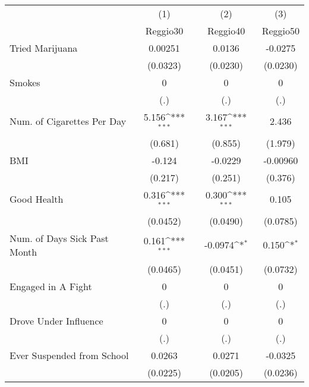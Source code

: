 {
\def\sym#1{\ifmmode^{#1}\else\(^{#1}\)\fi}
\begin{tabular}{l*{3}{c}}
\hline\hline
            &\multicolumn{1}{c}{(1)}&\multicolumn{1}{c}{(2)}&\multicolumn{1}{c}{(3)}\\
            &\multicolumn{1}{c}{Reggio30}&\multicolumn{1}{c}{Reggio40}&\multicolumn{1}{c}{Reggio50}\\
\hline
Tried Marijuana&     0.00251         &      0.0136         &     -0.0275         \\
            &    (0.0323)         &    (0.0230)         &    (0.0230)         \\
[1em]
Smokes      &           0         &           0         &           0         \\
            &         (.)         &         (.)         &         (.)         \\
[1em]
Num. of Cigarettes Per Day&       5.156\sym{***}&       3.167\sym{***}&       2.436         \\
            &     (0.681)         &     (0.855)         &     (1.979)         \\
[1em]
BMI         &      -0.124         &     -0.0229         &    -0.00960         \\
            &     (0.217)         &     (0.251)         &     (0.376)         \\
[1em]
Good Health &       0.316\sym{***}&       0.300\sym{***}&       0.105         \\
            &    (0.0452)         &    (0.0490)         &    (0.0785)         \\
[1em]
Num. of Days Sick Past Month&       0.161\sym{***}&     -0.0974\sym{*}  &       0.150\sym{*}  \\
            &    (0.0465)         &    (0.0451)         &    (0.0732)         \\
[1em]
Engaged in A Fight&           0         &           0         &           0         \\
            &         (.)         &         (.)         &         (.)         \\
[1em]
Drove Under Influence&           0         &           0         &           0         \\
            &         (.)         &         (.)         &         (.)         \\
[1em]
Ever Suspended from School&      0.0263         &      0.0271         &     -0.0325         \\
            &    (0.0225)         &    (0.0205)         &    (0.0236)         \\

\end{tabular}}
